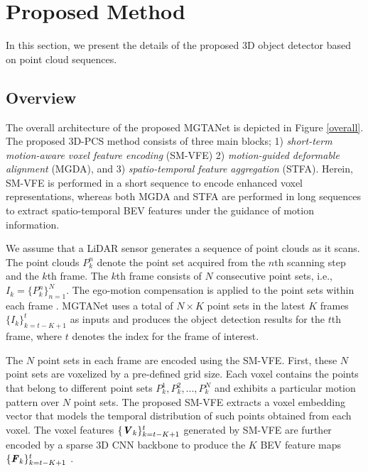 \documentclass[letterpaper]{article} \usepackage{aaai23}  \usepackage{times}  \usepackage{helvet}  \usepackage{courier}  \usepackage[hyphens]{url}  \usepackage{graphicx} \urlstyle{rm} \def\UrlFont{\rm}  \usepackage{natbib}  \usepackage{caption} \frenchspacing  \setlength{\pdfpagewidth}{8.5in} \usepackage{algorithm}
\begin{document}
\section{Proposed Method}
In this section, we present the details of the proposed 3D object detector based on point cloud sequences.

\subsection{Overview}
The overall architecture of the proposed MGTANet is depicted in Figure \ref{overall}. The proposed 3D-PCS method consists of three main blocks; 1) {\it short-term motion-aware voxel feature encoding} (SM-VFE) 2) {\it motion-guided deformable alignment} (MGDA), and 3) {\it spatio-temporal feature aggregation} (STFA). Herein, SM-VFE is performed in a short sequence to encode enhanced voxel representations, whereas both MGDA and STFA are performed in long sequences to extract spatio-temporal BEV features under the guidance of motion information.

We assume that a LiDAR sensor generates a sequence of point clouds as it scans. The point clouds $P_k^n$ denote the point set acquired from the $n$th scanning step and the $k$th frame.  The $k$th frame consists of $N$ consecutive point sets, i.e., $I_k=\{P_k^n \}_{n=1}^{N}$. The ego-motion compensation is applied to the point sets within each frame \cite{nuscenes}. MGTANet uses a total of $N \times K$ point sets in the latest $K$ frames $\{I_k\}_{k=t-K+1}^{t}$ as inputs and produces the object detection results for the $t$th frame, where $t$ denotes the index for the frame of interest.

The $N$ point sets in each frame are encoded using the SM-VFE. First, these $N$ point sets are voxelized by a pre-defined grid size. Each voxel contains the points that belong to different point sets $P_k^1,P_k^2, ..., P_k^N$  and exhibits a particular motion pattern over $N$ point sets. The proposed SM-VFE extracts a voxel embedding vector that models the temporal distribution of such points obtained from each voxel. 
The voxel features $\{\textbf{\textit{V}}_{k}\}_{k=t-K+1}^{t}$ generated by SM-VFE are further encoded by a sparse 3D CNN backbone to produce the $K$ BEV feature maps $\{\textbf{\textit{F}}_{k}\}_{k=t-K+1}^{t}$ \cite{second}.
\end{document}
